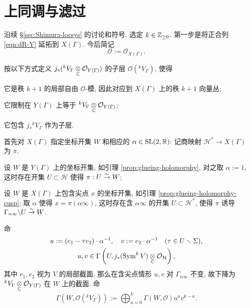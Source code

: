 \section{上同调与滤过}\label{sec:Shimura-filtration}
沿续 \S\ref{sec:Shimura-locsys} 的讨论和符号. 选定 $k \in \mathbb{Z}_{\geq 0}$. 第一步是将正合列 \eqref{eqn:dR-Y} 延拓到 $X(\Gamma)$. 今后简记
\[ \mathcal{O} := \mathcal{O}_{X(\Gamma)}. \]

\begin{definition-proposition}\label{def:Sym-extension}
	按以下方式定义 $j_* ( {}^k V_\Gamma \underset{\mathbb{C}}{\otimes} \mathcal{O}_{Y(\Gamma)})$ 的子层 $\mathcal{O}({}^k V_\Gamma)$, 使得
	\begin{compactenum}[(i)]
		\item 它是秩 $k + 1$ 的局部自由 $\mathcal{O}$-模, 因此对应到 $X(\Gamma)$ 上的秩 $k+1$ 向量丛;
		\item 它限制在 $Y(\Gamma)$ 上等于 ${}^k V_\Gamma \underset{\mathbb{C}}{\otimes} \mathcal{O}_{Y(\Gamma)}$;
		\item 它包含 $j_* {}^k V_\Gamma$ 作为子层.
	\end{compactenum}

	首先对 $X(\Gamma)$ 指定坐标开集 $W$ 和相应的 $\alpha \in \operatorname{SL}(2,\mathbb{R})$: 记商映射 $\mathcal{H}^* \to X(\Gamma)$ 为 $\pi$.
	\begin{compactitem}
		\item 设 $W$ 是 $Y(\Gamma)$ 上的坐标开集, 如引理 \ref{prop:glueing-holomorphy}, 对之取 $\alpha := 1$, 这时存在开集 $U \subset \mathcal{H}$ 使得 $\pi: U \stackrel{\sim}{\rightarrow} W$;
		\item 设 $W$ 是 $X(\Gamma)$ 上包含尖点 $x$ 的坐标开集, 如引理 \ref{prop:glueing-holomorphy-cusp}; 取 $\alpha$ 使得 $x = \pi(\alpha\infty)$, 这时存在含 $\alpha\infty$ 的开集 $U \subset \mathcal{H}^*$, 使得 $\pi$ 诱导 $\Gamma_{\alpha\infty} \backslash U \stackrel{\sim}{\rightarrow} W$.
	\end{compactitem}
	命
	\begin{gather*}
		u := (e_1 - \tau e_2) \cdot \alpha^{-1}, \quad v := e_2 \cdot \alpha^{-1} \quad (\tau \in U \smallsetminus \Sigma), \\
		u, v \in \Gamma\left(U, j_* (\operatorname{Sym}^k V) \underset{\mathbb{C}}{\otimes} \mathcal{O}_{\mathcal{H}} \right),
	\end{gather*}
	其中 $e_1, e_2$ 视为 $V$ 的局部截面, 那么在含尖点情形 $u, v$ 对 $\Gamma_{\alpha\infty}$ 不变, 故下降为 ${}^k V_\Gamma \underset{\mathbb{C}}{\otimes} \mathcal{O}_{Y(\Gamma)}$ 在 $W$ 上的截面. 命
	\[ \Gamma\left( W, \mathcal{O}({}^k V_\Gamma)\right) := \bigoplus_{a=0}^k \Gamma(W, \mathcal{O}) u^a v^{k-a}. \]
\end{definition-proposition}
